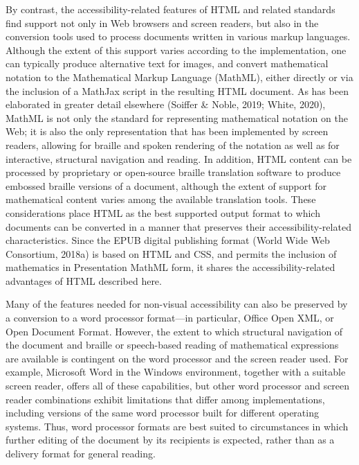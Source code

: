 \documentclass[11pt]{sig-alternate}
\begin{document}
\begin{large}
By contrast, the accessibility-related features of HTML and related standards find support not only in Web browsers and screen readers, but also in the conversion tools used to process documents written in various markup languages. Although the extent of this support varies according to the implementation, one can typically produce alternative text for images, and convert mathematical notation to the Mathematical Markup Language (MathML), either directly or via the inclusion of a MathJax script in the resulting HTML document. As has been elaborated in greater detail elsewhere (Soiffer \& Noble, 2019; White, 2020), MathML is not only the standard for representing mathematical notation on the Web; it is also the only representation that has been implemented by screen readers, allowing for braille and spoken rendering of the notation as well as for interactive, structural navigation and reading. In addition, HTML content can be processed by proprietary or open-source braille translation software to produce embossed braille versions of a document, although the extent of support for mathematical content varies among the available translation tools. These considerations place HTML as the best supported output format to which documents can be converted in a manner that preserves their accessibility-related characteristics. Since the EPUB digital publishing format (World Wide Web Consortium, 2018a) is based on HTML and CSS, and permits the inclusion of mathematics in Presentation MathML form, it shares the accessibility-related advantages of HTML described here.

Many of the features needed for non-visual accessibility can also be preserved by a conversion to a word processor format—in particular, Office Open XML, or Open Document Format. However, the extent to which structural navigation of the document and braille or speech-based reading of mathematical expressions are available is contingent on the word processor and the screen reader used. For example, Microsoft Word in the Windows environment, together with a suitable screen reader, offers all of these capabilities, but other word processor and screen reader combinations exhibit limitations that differ among implementations, including versions of the same word processor built for different operating systems. Thus, word processor formats are best suited to circumstances in which further editing of the document by its recipients is expected, rather than as a delivery format for general reading.


\end{large}
\end{document}
